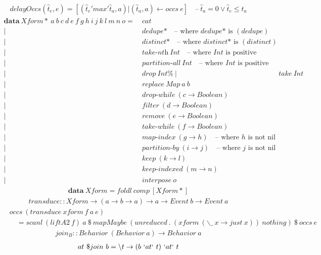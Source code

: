 \documentclass[fleqn]{amsart}
\newcommand{\zeroarity}[1]{&\ \textit{#1*}\quad\text{-- where }\textit{#1*}\text{ is }(#1)}
\newcommand{\positive}[1]{&\ \textit{#1}\ Int\quad\text{-- where }Int\text{ is positive}}
\newcommand{\integer}[1]{&\ #1\ Int}
\newcommand{\predicate}[2]{&\ \textit{#1}\ (#2 \rightarrow Boolean)}
\newcommand{\nonnillable}[3]{&\ \textit{#1}\ (#2 \rightarrow #3)\quad\text{-- where }#3\text{ is not nil}}
\newcommand{\any}[3]{&\ \textit{#1}\ (#2 \rightarrow #3)}
\begin{document}
\begin{align*}
  delayOccs(\hat{t}_e, e) = [(\hat{t}_e  'max' \hat{t}_a, a) | (\hat{t}_a, a) \leftarrow occs\ e] \quad \text{--}\ \hat{t}_a = 0 \lor \hat{t}_e \leq \hat{t}_a
\end{align*}
\begin{align*}
  \mathbf{data}\ Xform{*}\ a\ b\ c\ d\ e\ f\ g\ h\ i\ j\ k\ l\ m\ n\ o =&\ cat\\
  |\zeroarity{dedupe}\\
  |\zeroarity{distinct}\\
  |\positive{take-nth}\\
  |\positive{partition-all}\\
  |\integer{drop}\% \
  |\integer{take}\\
  |&\ replace\ Map\ a\ b\\
  |\predicate{drop-while}{c}\\
  |\predicate{filter}{d}\\
  |\predicate{remove}{e}\\
  |\predicate{take-while}{f}\\
  |\nonnillable{map-index}{g}{h}\\
  |\nonnillable{partition-by}{i}{j}\\
  |\any{keep}{k}{l}\\
  |\any{keep-indexed}{m}{n}\\
  |&\ interpose\ o
\end{align*}
\begin{align*}
  \mathbf{data}\ Xform = foldl\ comp\ [Xform*]
\end{align*}
\begin{align*}
  transduce :: Xform \rightarrow (a \rightarrow b \rightarrow a) \rightarrow a \rightarrow Event\ b \rightarrow Event\ a
\end{align*}
\begin{align*}
  &occs\ (transduce\ xform\ f\ a\ e)\\
  &\quad= scanl\ (liftA2\ f)\ a\ \$\ mapMaybe\ (unreduced\ .\ (xform\ (\backslash\_\ x\rightarrow just\ x))\ nothing)\ \$\ occs\ e
\end{align*}
\begin{align*}
  join_B :: Behavior\ (Behavior\ a) \rightarrow Behavior\ a
\end{align*}
\begin{align*}
  at\ \$join\ b =\backslash t \rightarrow (b\ `at` \ t)\ `at` \ t
\end{align*}
\end{document}
